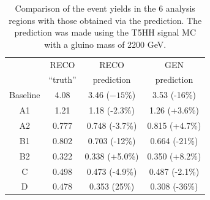 \begin{table}[hbp!]
\centering
\caption[Comparison of the event yields in the 6 analysis regions with those obtained via the prediction.]{
Comparison of the event yields in the 6 analysis regions with those obtained via the prediction. The prediction was made using the T5HH signal MC with a gluino mass of 2200 GeV.
}
\begin{tabular}{c | c c c}
\hline\hline
         & RECO & RECO           & GEN\\
         & ``truth''             & prediction     & prediction\\
\hline
Baseline & 4.08     & 3.46 (${-}15\%$)   & 3.53 (-16\%)\\
A1       & 1.21     & 1.18 (-2.3\%)  & 1.26 (+3.6\%)\\
A2       & 0.777    & 0.748 (-3.7\%) & 0.815 (+4.7\%)\\
B1       & 0.802    & 0.703 (-12\%)  & 0.664 (-21\%)\\
B2       & 0.322    & 0.338 (+5.0\%) & 0.350 (+8.2\%)\\
C        & 0.498    & 0.473 (-4.9\%) & 0.487 (-2.1\%)\\
D        & 0.478    & 0.353 (25\%)   & 0.308 (-36\%)\\
\hline\hline
\end{tabular}
\label{tab:predclos}
\end{table}

%
